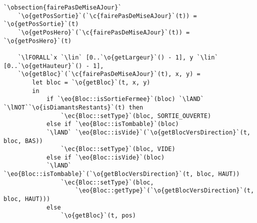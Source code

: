 \documentclass{article}
\newcommand{\lAND}{$\land$}
\newcommand{\lNOT}{$\lnot$}
\newcommand{\lFORALL}{$\forall$}
\newcommand{\lin}{$\in$}
\newcommand{\obsection}[1]{\textbf{[#1]}}
\renewcommand{\o}[1]{\textcolor{blue}{#1}}
\renewcommand{\c}[1]{\textcolor{red}{#1}}
\newcommand{\eo}[1]{\textcolor{RoyalPurple}{#1}}
\newcommand{\ec}[1]{\textcolor{BrickRed}{#1}}
\begin{document}
\begin{lstlisting}[caption=Terrain]
`\obsection{fairePasDeMiseAJour}`
	`\o{getPosSortie}`(`\c{fairePasDeMiseAJour}`(t)) = `\o{getPosSortie}`(t)
	`\o{getPosHero}`(`\c{fairePasDeMiseAJour}`(t)) = `\o{getPosHero}`(t)

	`\lFORALL`x `\lin` [0..`\o{getLargeur}`() - 1], y `\lin` [0..`\o{getHauteur}`() - 1],
	`\o{getBloc}`(`\c{fairePasDeMiseAJour}`(t), x, y) =
		let bloc = `\o{getBloc}`(t, x, y)
		in
			if `\eo{Bloc::isSortieFermee}`(bloc) `\lAND` `\lNOT``\o{isDiamantsRestants}`(t) then
				`\ec{Bloc::setType}`(bloc, SORTIE_OUVERTE)
			else if `\eo{Bloc::isTombable}`(bloc)
			`\lAND` `\eo{Bloc::isVide}`(`\o{getBlocVersDirection}`(t, bloc, BAS))
				`\ec{Bloc::setType}`(bloc, VIDE)
			else if `\eo{Bloc::isVide}`(bloc)
			`\lAND` `\eo{Bloc::isTombable}`(`\o{getBlocVersDirection}`(t, bloc, HAUT))
				`\ec{Bloc::setType}`(bloc,
					`\eo{Bloc::getType}`(`\o{getBlocVersDirection}`(t, bloc, HAUT)))
			else
				`\o{getBloc}`(t, pos)
\end{lstlisting}
\clearpage
\end{document}
